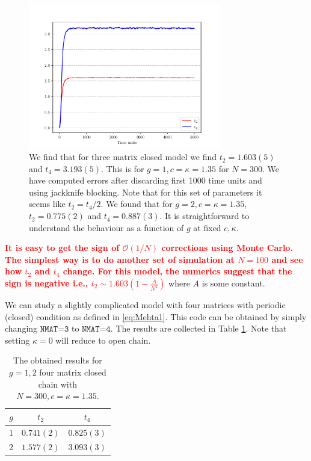 \documentclass[11pt]{article}
\newcommand{\TODO}[1]{\textcolor{red}{{\bf #1}}}
\begin{document}
\begin{figure}[htbp] 
	\centering 
	\includegraphics[width=0.75\textwidth]{figs/3MM_closed.pdf}
	\caption{\label{fig:3MM_closed}We find that for three matrix closed model we find $t_{2} = 1.603(5)$ and $t_{4} = 3.193(5)$. 
	This is for $g=1, c=\kappa=1.35$ for $N=300$. We have computed errors after discarding first 1000 time units and 
	using jackknife blocking. Note that for this set of parameters it seems like $t_{2} = t_{4}/2$. We found that 
	for $g=2, c=\kappa=1.35$, $t_{2} = 0.775(2)$ and $t_{4} = 0.887(3)$. It is straightforward to understand the behaviour
	as a function of $g$ at fixed $c, \kappa$.}
\end{figure}

\TODO{It is easy to get the sign of $\mathcal{O}(1/N)$ corrections using Monte Carlo. 
The simplest way is to do another set of simulation at $N = 100$ and see how $t_{2}$ and 
$t_{4}$ change. For this model, the numerics suggest that the sign is negative
i.e., $t_{2} \sim 1.603(1 - \frac{A}{N^2})$} where $A$ is some constant. 


We can study a slightly complicated model with four matrices with periodic (closed) condition as defined in \ref{eq:Mehta1}.
This code can be obtained by simply changing $\texttt{NMAT=3}$ to  $\texttt{NMAT=4}$. 
The results are collected in Table \ref{table:4mchain_data}. Note that setting $\kappa=0$ will reduce to open chain.        


\begin{table}[h!]
	\centering
	\begin{tabular}{||c c c||} 
		\hline
		$g$ & $ t_2 $ & $t_4 $ \\ [0.5ex] 
		\hline\hline
		1 & $ 0.741(2)$ & $0.825(3) $  \\ 
		2 & $ 1.577(2) $ & $3.093(3)$
		 \\ [1ex] 
		\hline 
	\end{tabular}
\caption{The obtained results for $g=1,2$ four matrix closed chain with $N=300, c=\kappa=1.35$.}
\label{table:4mchain_data}
\end{table}
\end{document}
